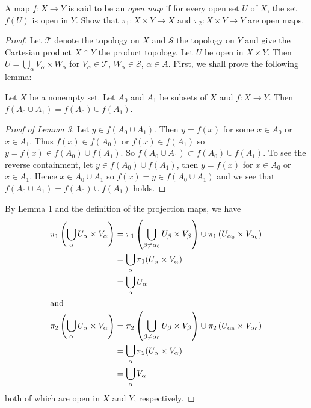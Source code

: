 \begin{problem}[Munkres, \S16, 4.]
A map $f\colon X\to Y$ is said to be an \emph{open map} if for
every open set $U$ of $X$, the set $f(U)$ is open in $Y$. Show
that $\pi_1\colon X\times Y\to X$ and $\pi_2\colon X\times Y\to
Y$ are open maps.
\end{problem}
\begin{proof}
Let $\mathcal{T}$ denote the topology on $X$ and $\mathcal{S}$
the topology on $Y$ and give the Cartesian product $X\cap Y$ the
product topology. Let $U$ be open in $X\times Y$. Then
$U=\bigcup_{\alpha}V_\alpha\times W_\alpha$ for $V_\alpha\in\mathcal{T}$,
$W_\alpha\in\mathcal{S}$, $\alpha\in A$. First, we shall prove
the following lemma:
\begin{lemma}
Let $X$ be a nonempty set. Let $A_0$ and $A_1$ be subsets of
$X$ and $f\colon X\to Y$. Then $f(A_0\cup A_1)=f(A_0)\cup
f(A_1)$.
\end{lemma}
\begin{proof}[Proof of Lemma 3]
\renewcommand\qedsymbol{$\vardiamondsuit$}
Let $y\in f(A_0\cup A_1)$. Then $y=f(x)$ for some $x\in A_0$ or
$x\in A_1$. Thus $f(x)\in f(A_0)$ or $f(x)\in f(A_1)$ so
$y=f(x)\in f(A_0)\cup f(A_1)$. So $f(A_0\cup A_1)\subset
f(A_0)\cup f(A_1)$. To see the reverse containment, let $y\in
f(A_0)\cup f(A_1)$, then $y=f(x)$ for $x\in A_0$ or $x\in
A_1$. Hence $x\in A_0\cup A_1$ so $f(x)=y\in f(A_0\cup A_1)$ and
we see that $f(A_0\cup A_1)=f(A_0)\cup f(A_1)$ holds.
\end{proof}
By Lemma 1 and the definition of the projection maps, we have
\begin{align*}
\pi_1\left(\bigcup_\alpha U_\alpha\times V_\alpha\right)
&=\pi_1\left(\bigcup_{\beta\neq\alpha_0}U_\beta\times V_\beta\right)
  \cup\pi_1\left(U_{\alpha_0}\times V_{\alpha_0}\right)\\
&=\bigcup_\alpha \pi_1(U_\alpha\times V_\alpha)\\
&=\bigcup_\alpha U_\alpha\\
\shortintertext{and}
\pi_2\left(\bigcup_\alpha U_\alpha\times V_\alpha\right)
&=\pi_2\left(\bigcup_{\beta\neq\alpha_0}U_\beta\times V_\beta\right)
  \cup\pi_2\left(U_{\alpha_0}\times V_{\alpha_0}\right)\\
&=\bigcup_\alpha \pi_2(U_\alpha\times V_\alpha)\\
&=\bigcup_\alpha V_\alpha
\end{align*}
both of which are open in $X$ and $Y$, respectively.
\end{proof}
\newpage

